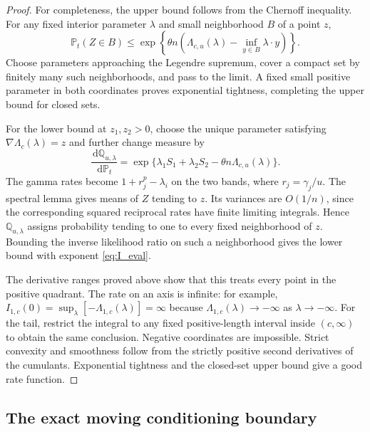 \documentclass[11pt,letterpaper]{article}
\numberwithin{equation}{section}
\theoremstyle{definition}
\theoremstyle{remark}
\newcommand{\PP}{\mathbb P}
\newcommand{\QQ}{\mathbb Q}
\newcommand{\dd}{\,\mathrm d}
\begin{document}
\begin{proof}
For completeness, the upper bound follows from the Chernoff inequality. For any fixed interior parameter $\lambda$ and small neighborhood $B$ of a point $z$,
\[
 \PP_t(Z\in B)\le
 \exp\left\{\theta n\left(\Lambda_{c,u}(\lambda)
 -\inf_{y\in B}\lambda\cdot y\right)\right\}.
\]
Choose parameters approaching the Legendre supremum, cover a compact set by finitely many such neighborhoods, and pass to the limit. A fixed small positive parameter in both coordinates proves exponential tightness, completing the upper bound for closed sets.

For the lower bound at $z_1,z_2>0$, choose the unique parameter satisfying $\nabla\Lambda_c(\lambda)=z$ and further change measure by
\begin{equation}\label{eq:secondtilt}
 \frac{\dd\QQ_{u,\lambda}}{\dd\PP_t}
 =\exp\{\lambda_1S_1+\lambda_2S_2-\theta n\Lambda_{c,u}(\lambda)\}.
\end{equation}
The gamma rates become $1+r_j^p-\lambda_i$ on the two bands, where $r_j=\gamma_j/u$. The spectral lemma gives means of $Z$ tending to $z$. Its variances are $O(1/n)$, since the corresponding squared reciprocal rates have finite limiting integrals. Hence $\QQ_{u,\lambda}$ assigns probability tending to one to every fixed neighborhood of $z$. Bounding the inverse likelihood ratio on such a neighborhood gives the lower bound with exponent \cref{eq:I_eval}.

The derivative ranges proved above show that this treats every point in the positive quadrant. The rate on an axis is infinite: for example, $I_{1,c}(0)=\sup_\lambda[-\Lambda_{1,c}(\lambda)]=\infty$ because $\Lambda_{1,c}(\lambda)\to-\infty$ as $\lambda\to-\infty$. For the tail, restrict the integral to any fixed positive-length interval inside $(c,\infty)$ to obtain the same conclusion. Negative coordinates are impossible. Strict convexity and smoothness follow from the strictly positive second derivatives of the cumulants. Exponential tightness and the closed-set upper bound give a good rate function.
\end{proof}

\subsection{The exact moving conditioning boundary}
\end{document}
